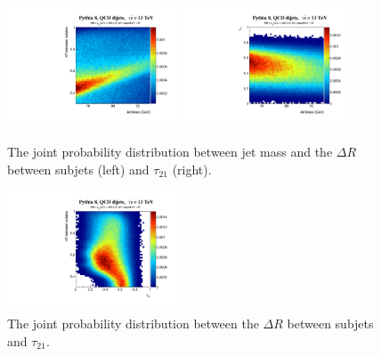 \documentclass{article}
\begin{document}
\begin{figure}[htbp!]
  \begin{center}
        \includegraphics[width=0.45\textwidth]{figures/mass_dR_back.pdf} \includegraphics[width=0.45\textwidth]{figures/mass_tau21_back.pdf}
      \caption{ The joint probability distribution between jet mass and the $\Delta R$ between subjets (left) and $\tau_{21}$ (right).  
      \label{fig:mass_tau21} }
    \end{center}
\end{figure}

\begin{figure}[htbp!]
  \begin{center}
        \includegraphics[width=0.45\textwidth]{figures/tau21_dR_back.pdf}
      \caption{ The joint probability distribution between the $\Delta R$ between subjets and $\tau_{21}$.      \label{fig:dr_tau21} }
    \end{center}
\end{figure}

\clearpage
\newpage

 
\end{document}
